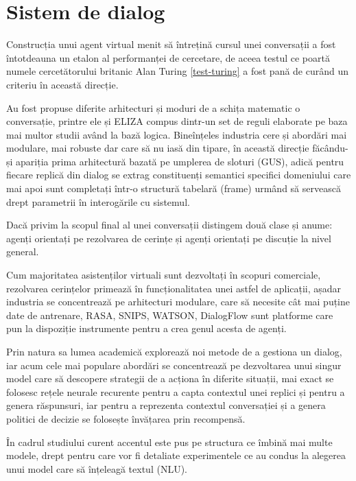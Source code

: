 \chapter{Sistem de dialog}


Construcția unui agent virtual menit să întrețină cursul unei conversații a fost întotdeauna un etalon al performanței de cercetare, de aceea testul ce poartă numele cercetătorului britanic Alan Turing \ref{test-turing} a fost pană de curând un criteriu în această direcție.

Au fost propuse diferite arhitecturi și moduri de a schița matematic o conversație, printre ele și ELIZA compus dintr-un set de reguli elaborate pe baza mai multor studii având la bază logica. Bineînțeles industria cere și abordări mai modulare, mai robuste dar care să nu iasă din tipare, în această direcție făcându-și apariția prima arhitectură bazată pe umplerea de sloturi (GUS), adică pentru fiecare replică din dialog se extrag constituenți semantici specifici domeniului care mai apoi sunt completați într-o structură tabelară (frame) urmând să servească drept parametrii în interogările cu sistemul.

Dacă privim la scopul final al unei conversații distingem două clase și anume: agenți orientați pe rezolvarea de cerințe și agenți orientați pe discuție la nivel general.

Cum majoritatea asistenților virtuali sunt dezvoltați în scopuri comerciale, rezolvarea cerințelor primează în funcționalitatea unei astfel de aplicații, așadar industria se concentrează pe arhitecturi modulare, care să necesite cât mai puține date de antrenare, RASA, SNIPS, WATSON, DialogFlow sunt platforme care pun la dispoziție instrumente pentru a crea genul acesta de agenți.

Prin natura sa lumea academică explorează noi metode de a gestiona un dialog, iar acum cele mai populare abordări se concentrează pe dezvoltarea unui singur model care să descopere strategii de a acționa în diferite situații, mai exact se folosesc rețele neurale recurente pentru a capta contextul unei replici și pentru a genera răspunsuri, iar pentru a reprezenta contextul conversației și a genera politici de decizie se folosește învățarea prin recompensă. \cite{rl-seq2seq}

În cadrul studiului curent accentul este pus pe structura ce îmbină mai multe modele, drept pentru care vor fi detaliate experimentele ce au condus la alegerea unui model care să înțeleagă textul (NLU).

